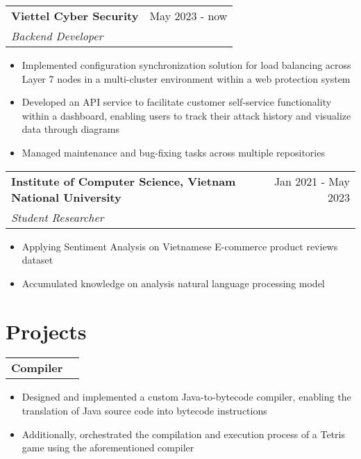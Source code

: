 \documentclass[a4paper,12pt]{article}
\begin{document}
\begin{tabularx}{\linewidth}{ @{}l r@{} }
    \textbf{Viettel Cyber Security} & \hfill May 2023 - now \\[3.75pt]
    \textit{Backend Developer}
\end{tabularx}
\begin{itemize}
    \item Implemented configuration synchronization solution for load balancing across Layer 7 nodes in a multi-cluster environment within a web protection system
    \item Developed an API service to facilitate customer self-service functionality within a dashboard, enabling users to track their attack history and visualize data through diagrams
    \item Managed maintenance and bug-fixing tasks across multiple repositories
\end{itemize}

\begin{tabularx}{\linewidth}{ @{}l r@{} }
\textbf{Institute of Computer Science, Vietnam National University} & \hfill Jan 2021 - May 2023 \\[3.75pt]
\textit{Student Researcher}
\end{tabularx}
\begin{itemize}
    \item Applying Sentiment Analysis on Vietnamese E-commerce product reviews dataset
    \item Accumulated knowledge on analysis natural language processing model
\end{itemize}


\section{Projects}

\begin{tabularx}{\linewidth}{ @{}l r@{} }
\textbf{Compiler} & \hfill \\[3.75pt]
\end{tabularx}
\begin{itemize}
    \item Designed and implemented a custom Java-to-bytecode compiler, enabling the translation of Java source code into bytecode instructions
    \item Additionally, orchestrated the compilation and execution process of a Tetris game using the aforementioned compiler
\end{itemize}
\end{document}
